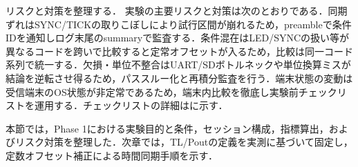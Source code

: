 リスクと対策を整理する．
実験の主要リスクと対策は次のとおりである．同期ずれはSYNC/TICKの取りこぼしにより試行区間が崩れるため，preambleで条件IDを通知しログ末尾のsummaryで監査する．条件混在はLED/SYNCの扱い等が異なるコードを跨いで比較すると定常オフセットが入るため，比較は同一コード系列で統一する．欠損・単位不整合はUART/SDボトルネックや単位換算ミスが結論を逆転させ得るため，パススルー化と再積分監査を行う．端末状態の変動は受信端末のOS状態が非定常であるため，端末内比較を徹底し実験前チェックリストを運用する．チェックリストの詳細はに示す．

本節では，Phase 1における実験目的と条件，セッション構成，指標算出，およびリスク対策を整理した．次章では，TL/Poutの定義を実測に基づいて固定し，定数オフセット補正による時間同期手順を示す．









